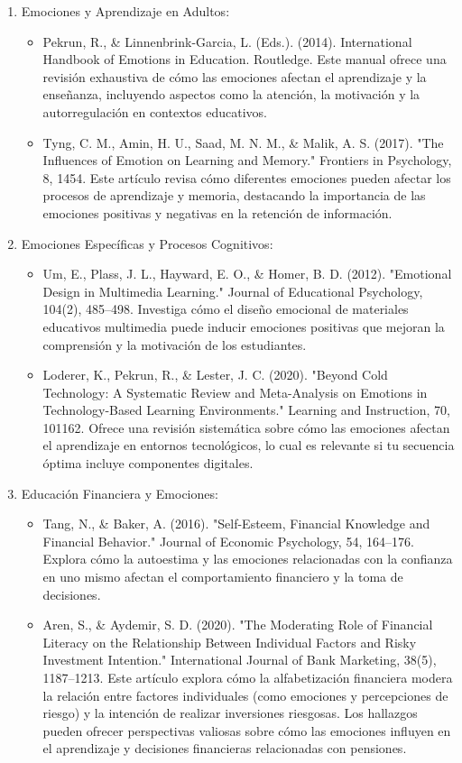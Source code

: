 \documentclass{article}
\begin{document}
\begin{enumerate}
    \item Emociones y Aprendizaje en Adultos:
    \begin{itemize}
        \item Pekrun, R., \& Linnenbrink-Garcia, L. (Eds.). (2014). International Handbook of Emotions in Education. Routledge. Este manual ofrece una revisión exhaustiva de cómo las emociones afectan el aprendizaje y la enseñanza, incluyendo aspectos como la atención, la motivación y la autorregulación en contextos educativos.
        \item Tyng, C. M., Amin, H. U., Saad, M. N. M., \& Malik, A. S. (2017). "The Influences of Emotion on Learning and Memory." Frontiers in Psychology, 8, 1454. Este artículo revisa cómo diferentes emociones pueden afectar los procesos de aprendizaje y memoria, destacando la importancia de las emociones positivas y negativas en la retención de información.
    \end{itemize}
    \item Emociones Específicas y Procesos Cognitivos:
    \begin{itemize}
        \item Um, E., Plass, J. L., Hayward, E. O., \& Homer, B. D. (2012). "Emotional Design in Multimedia Learning." Journal of Educational Psychology, 104(2), 485–498. Investiga cómo el diseño emocional de materiales educativos multimedia puede inducir emociones positivas que mejoran la comprensión y la motivación de los estudiantes.
        \item Loderer, K., Pekrun, R., \& Lester, J. C. (2020). "Beyond Cold Technology: A Systematic Review and Meta-Analysis on Emotions in Technology-Based Learning Environments." Learning and Instruction, 70, 101162. Ofrece una revisión sistemática sobre cómo las emociones afectan el aprendizaje en entornos tecnológicos, lo cual es relevante si tu secuencia óptima incluye componentes digitales.
    \end{itemize}
    \item Educación Financiera y Emociones:
    \begin{itemize}
        \item Tang, N., \& Baker, A. (2016). "Self-Esteem, Financial Knowledge and Financial Behavior." Journal of Economic Psychology, 54, 164–176. Explora cómo la autoestima y las emociones relacionadas con la confianza en uno mismo afectan el comportamiento financiero y la toma de decisiones.
        \item Aren, S., \& Aydemir, S. D. (2020). "The Moderating Role of Financial Literacy on the Relationship Between Individual Factors and Risky Investment Intention." International Journal of Bank Marketing, 38(5), 1187–1213. Este artículo explora cómo la alfabetización financiera modera la relación entre factores individuales (como emociones y percepciones de riesgo) y la intención de realizar inversiones riesgosas. Los hallazgos pueden ofrecer perspectivas valiosas sobre cómo las emociones influyen en el aprendizaje y decisiones financieras relacionadas con pensiones.

\end{itemize}
\end{enumerate}
\end{document}
